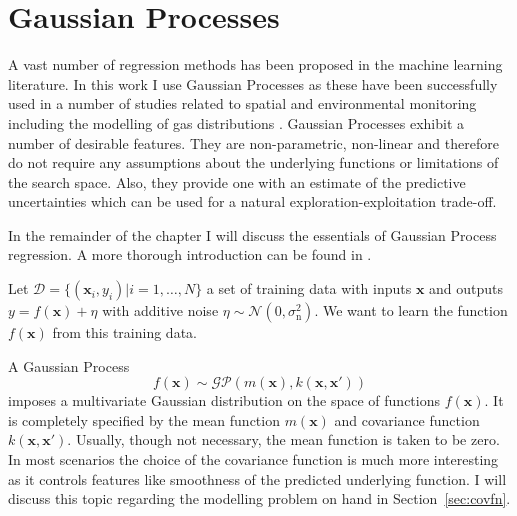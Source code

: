 \documentclass[11pt,a4paper,twoside,BCOR=15mm]{scrreprt}
\newcommand{\vc}[1]{\bm{#1}}
\newcommand{\ped}[1]{_{\mathrm{#1}}}
\begin{document}
\tableofcontents




\chapter{Gaussian Processes}
A vast number of regression methods has been proposed in the machine learning 
literature. In this work I use Gaussian Processes as these have been 
successfully used in a number of studies related to spatial and environmental 
monitoring including the modelling of gas distributions 
\parencite[e.g.][]{Stranders:2008wl, Marchant:2012wb, Stachniss:2008vz}.  
Gaussian Processes exhibit a number of desirable features. They are 
non-parametric, non-linear and therefore do not require any assumptions about 
the underlying functions or limitations of the search space.  Also, they provide 
one with an estimate of the predictive uncertainties which can be used for 
a natural exploration-exploitation trade-off.

In the remainder of the chapter I will discuss the essentials of Gaussian 
Process regression. A more thorough introduction can be found in 
\textcite{Rasmussen:2006vz}.

Let $\mathcal{D} = \{(\vc{x}_i, y_i) | i = 1, \dots, N\}$ a set of training data 
with inputs $\vc x$ and outputs $y = f(\vc x) + \eta$ with additive noise $\eta 
\sim \mathcal{N}(0, \sigma\ped{n}^2)$. We want to learn the function $f(\vc x)$ 
from this training data.

A Gaussian Process
\begin{equation}
    f(\vc x) \sim \mathcal{GP}(m(\vc x), k(\vc x, \vc x'))
\end{equation}
imposes a multivariate Gaussian distribution on the space of functions $f(\vc 
x)$. It is completely specified by the mean function $m(\vc x)$ and covariance 
function $k(\vc x, \vc x')$. Usually, though not necessary, the mean function is 
taken to be zero. In most scenarios the choice of the covariance function is 
much more interesting as it controls features like smoothness of the predicted 
underlying function. I will discuss this topic regarding the modelling problem 
on hand in Section~\ref{sec:covfn}.
\end{document}

